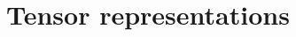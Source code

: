 \documentclass[12pt]{article}
\numberwithin{equation}{section}    %
\begin{document}

\section{Tensor representations}
\end{document}
